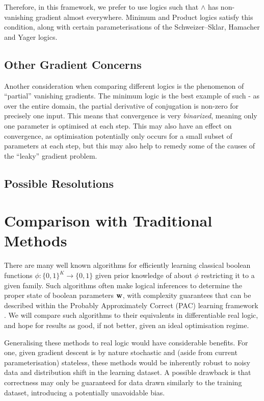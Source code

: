 Therefore, in this framework, we prefer to use logics such that $\land$ has non-vanishing gradient almost everywhere. Minimum and Product logics satisfy this condition, along with certain parameterisations of the Schweizer–Sklar, Hamacher and Yager logics.

\subsection{Other Gradient Concerns}

Another consideration when comparing different logics is the phenomenon of ``partial'' vanishing gradients. The minimum logic is the best example of such - as over the entire domain, the partial derivative of conjugation is non-zero for precisely one input. This means that convergence is very \textit{binarized}, meaning only one parameter is optimised at each step. This may also have an effect on convergence, as optimisation potentially only occurs for a small subset of parameters at each step, but this may also help to remedy some of the causes of the ``leaky'' gradient problem.

\subsection{Possible Resolutions}



\section{Comparison with Traditional Methods}

There are many well known algorithms for efficiently learning classical boolean functions $\phi : \{0,1\}^K \to \{0,1\}$ given prior knowledge of about $\phi$ restricting it to a given family. Such algorithms often make logical inferences to determine the proper state of boolean parameters $\mathbf{w}$, with complexity guarantees that can be described within the Probably Approximately Correct (PAC) learning framework \cite{clt}. We will compare such algorithms to their equivalents in differentiable real logic, and hope for results as good, if not better, given an ideal optimisation regime. 

Generalising these methods to real logic would have considerable benefits. For one, given gradient descent is by nature stochastic and (aside from current parameterisation) stateless, these methods would be inherently robust to noisy data and distribution shift in the learning dataset. A possible drawback is that correctness may only be guaranteed for data drawn similarly to the training dataset, introducing a potentially unavoidable bias.

